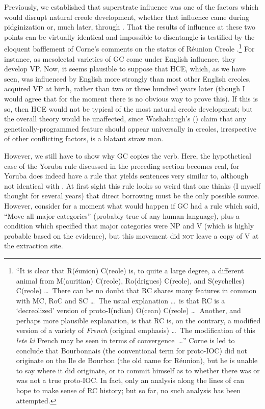 Previously, we established that superstrate influence was one of the factors which would disrupt natural creole development, whether that influence came during pidginization or, much later, through
. That the results of influence at these two points can be virtually identical and impossible to disentangle is testified by the eloquent bafflement of Corne's comments on the status of Réunion Creole \citep[223--224]{Corne1977}.\footnote{``It is clear that R(éunion) C(reole) is, to quite a large degree, a different animal from M(auritian) C(reole), Ro(drigues) C(reole), and S(eychelles) C(reole) \ldots~There can be no doubt that RC shares many features in common with MC, RoC and SC \ldots~The usual explanation \ldots~is that RC is a `decreolized' version of proto-I(ndian) O(cean) C(reole) \ldots~Another, and perhaps more plausible explanation, is that RC is, on the contrary, a modified version of a variety of \textit{French} (original emphasis) \ldots~The modification of this \textit{lete} \textit{ki} French may be seen in terms of convergence~\ldots'' Corne is led to conclude that Bourbonnais (the conventional term for proto-IOC) did not originate on the Ile de Bourbon (the old name for Réunion), but he is unable to say where it did originate, or to commit himself as to whether there was or was not a true proto-IOC. In fact, only an analysis along the lines of \citet{Bickerton1975} can hope to make sense of RC history; but so far, no such analysis has been attempted.} For instance, as mesolectal varieties of GC come under English influence, they develop VP. Now, it seems plausible to suppose that HCE, which, as we have seen, was influenced by English more strongly than most other English creoles, acquired VP at birth, rather than two or three hundred years later (though I would agree that for the moment there is no obvious way to prove this). If this is so, then HCE would not be typical of the most natural creole development; but the overall theory would be unaffected, since Washabaugh's (\citeyear{Washabaugh1979}) claim that any genetically-programmed feature should appear universally in creoles, irrespective of other conflicting factors, is a blatant straw man.

However, we still have to show why GC copies the verb. Here, the hypothetical case of the Yoruba rule discussed in the preceding section becomes real, for Yoruba does indeed have a rule that yields sentences very similar to, although not identical with . At first sight this rule looks so weird that one thinks (I myself thought for several years) that direct borrowing must be the only possible source. However, consider for a moment what would happen if GC had a rule which said, ``Move all major categories'' (probably true of any human lan\-guage), plus a condition which specified that major categories were NP and V (which is highly probable based on the evidence), but this movement did \textsc{not} leave a copy of V at the extraction site.

